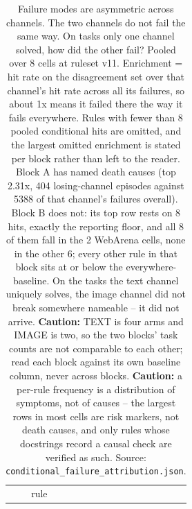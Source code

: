 \begin{table}[tbp]
\centering
\caption{Failure modes are asymmetric across channels. The two channels do not fail the same way. On tasks only one channel solved, how did the other fail? Pooled over 8 cells at ruleset v11. Enrichment = hit rate on the disagreement set over that channel's hit rate across all its failures, so about 1x means it failed there the way it fails everywhere. Rules with fewer than 8 pooled conditional hits are omitted, and the largest omitted enrichment is stated per block rather than left to the reader. Block A has named death causes (top 2.31x, 404 losing-channel episodes against 5388 of that channel's failures overall). Block B does not: its top row rests on 8 hits, exactly the reporting floor, and all 8 of them fall in the 2 WebArena cells, none in the other 6; every other rule in that block sits at or below the everywhere-baseline. On the tasks the text channel uniquely solves, the image channel did not break somewhere nameable -- it did not arrive. \textbf{Caution:} TEXT is four arms and IMAGE is two, so the two blocks' task counts are not comparable to each other; read each block against its own baseline column, never across blocks. \textbf{Caution:} a per-rule frequency is a distribution of symptoms, not of causes -- the largest rows in most cells are risk markers, not death causes, and only rules whose docstrings record a causal check are verified as such. Source: \texttt{conditional\_failure\_attribution.json}.}
\label{tab:t41}
\small
\setlength{\tabcolsep}{4pt}
\begin{tabular}{@{}
  >{\raggedright\arraybackslash}p{}
  >{\raggedright\arraybackslash}p{}
  >{\raggedright\arraybackslash}p{}
  >{\raggedright\arraybackslash}p{}
  >{\raggedright\arraybackslash}p{}
  >{\raggedright\arraybackslash}p{}
  >{\raggedright\arraybackslash}p{}@{}}
\toprule
\begin{minipage}[b]{\linewidth}\raggedright
\end{minipage} & \begin{minipage}[b]{\linewidth}\raggedright
rule
\end{minipage} & \begin{minipage}[b]{\linewidth}\raggedright

\end{minipage}
\end{tabular}
\end{table}
